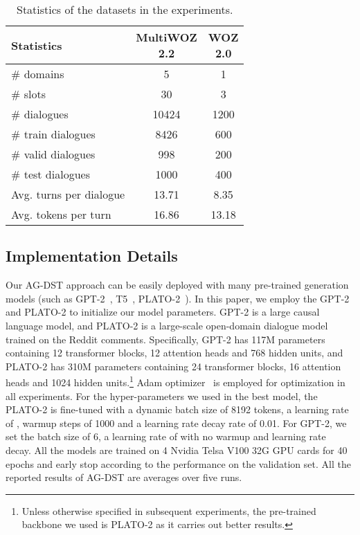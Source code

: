\documentclass[11pt]{article}
\begin{document}
\begin{table}
\centering
\begin{tabular}{lcc}
\hline
\textbf{Statistics} & \makecell[c]{\textbf{MultiWOZ} \\ \textbf{2.2}} & \makecell[c]{\textbf{WOZ} \\ \textbf{2.0}} \\
\hline
\hline
\# domains & 5 & 1 \\
\# slots & 30 & 3 \\
\# dialogues & 10424 & 1200 \\
\# train dialogues & 8426 & 600 \\
\# valid dialogues & 998 & 200 \\
\# test dialogues & 1000 & 400 \\
Avg. turns per dialogue & 13.71 & 8.35 \\
Avg. tokens per turn & 16.86 & 13.18 \\
\hline
\end{tabular}
\caption{Statistics of the datasets in the experiments.}\label{tab:datasets}
\end{table}

\subsection{Implementation Details}\label{sec:implementation_details}

Our AG-DST approach can be easily deployed with many pre-trained generation models (such as GPT-2~\citep{radford2019language}, T5~\citep{JMLR:v21:20-074}, PLATO-2~\citep{bao-etal-2021-plato}). In this paper, we employ the GPT-2 and PLATO-2 to initialize our model parameters. GPT-2 is a large causal language model, and PLATO-2 is a large-scale open-domain dialogue model trained on the Reddit comments. Specifically, GPT-2 has 117M parameters containing 12 transformer blocks, 12 attention heads and 768 hidden units, and PLATO-2 has 310M parameters containing 24 transformer blocks, 16 attention heads and 1024 hidden units.\footnote{Unless otherwise specified in subsequent experiments, the pre-trained backbone we used is PLATO-2 as it carries out better results.} Adam optimizer~\citep{yoshua2015adam} is employed for optimization in all experiments. For the hyper-parameters we used in the best model, the PLATO-2 is fine-tuned with a dynamic batch size of 8192 tokens, a learning rate of , warmup steps of 1000 and a  learning rate decay rate of 0.01. For GPT-2, we set the batch size of 6, a learning rate of  with no warmup and learning rate decay. All the models are trained on 4 Nvidia Telsa V100 32G GPU cards for 40 epochs and early stop according to the performance on the validation set. All the reported results of AG-DST are averages over five runs.
\end{document}
